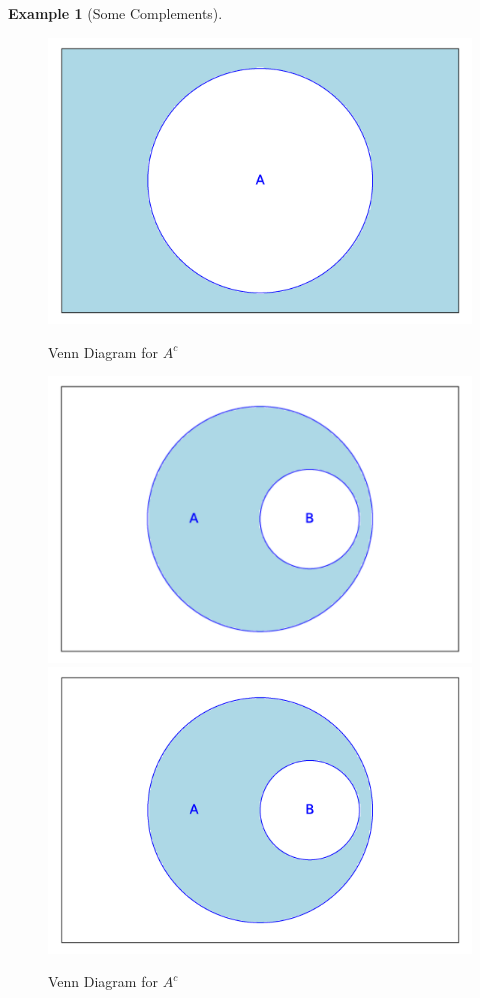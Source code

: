 \documentclass[10pt,]{book}
\theoremstyle{plain}
\theoremstyle{definition}
\theoremstyle{definition}
\theoremstyle{definition}
\newtheorem{example}[theorem]{Example}
\theoremstyle{definition}
\begin{document}
\begin{example}[Some Complements]
\begin{figure}
{\includegraphics[width=1\linewidth]{images/sageplot-venn-complement2.png}}
\caption{Venn Diagram for \(A^{c}\)\label{venn_diagram_complement2}}
\end{figure}
\leavevmode%
\begin{figure}
\centering
{}%
{\includegraphics[width=1\linewidth]{images/sageplot-venn-complement3.pdf}}%
{\includegraphics[width=1\linewidth]{images/sageplot-venn-complement3.png}}
\caption{Venn Diagram for \(A^{c}\)\label{venn_diagram_complement3}}
\end{figure}
\end{example}
\end{document}
